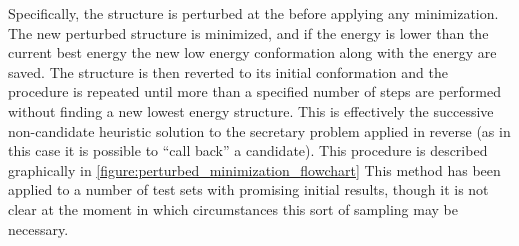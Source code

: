 Specifically, the structure is perturbed at the before applying any minimization.
The new perturbed structure is minimized, and if the energy is lower than the current best energy the new low energy conformation along with the energy are saved.
The structure is then reverted to its initial conformation and the procedure is repeated until more than a specified number of steps are performed without finding a new lowest energy structure.
This is effectively the successive non-candidate heuristic solution to the secretary problem applied in reverse (as in this case it is possible to ``call back'' a candidate).
This procedure is described graphically in \ref{figure:perturbed_minimization_flowchart}
This method has been applied to a number of test sets with promising initial results, though it is not clear at the moment in which circumstances this sort of sampling may be necessary.
